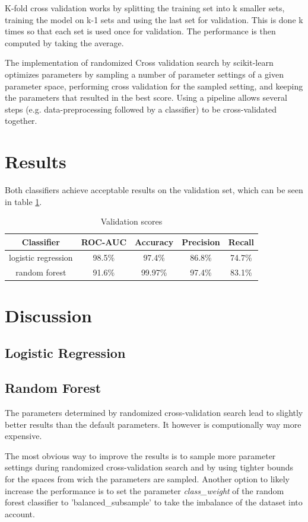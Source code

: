 \documentclass[a4, 10 pt, conference]{ieeeconf}  %
\begin{document}
K-fold cross validation works by splitting the training set into k smaller sets, training the model on k-1 sets and using the last set for validation. This is done k times so that each set is used once for validation. The performance is then computed by taking the average. \cite{sl.cv}

The implementation of randomized Cross validation search by scikit-learn optimizes parameters by sampling a number of parameter settings of a given parameter space, performing cross validation for the sampled setting, and keeping the parameters that resulted in the best score. Using a pipeline allows several steps (e.g. data-preprocessing followed by a classifier) to be cross-validated together. \cite{sl.rcv}

\section{Results}
\label{sec:results}
Both classifiers achieve acceptable results on the validation set, which can be seen in table \ref{tab:results}.

\begin{table}[h]
\centering
\begin{tabular}{c|c|c|c|c}
Classifier & ROC-AUC & Accuracy & Precision & Recall\\
\hline logistic regression & 98.5\% &  97.4\% & 86.8\% & 74.7\% \\
\hline random forest & 91.6\% & 99.97\% & 97.4\% & 83.1\%
\end{tabular}
\caption{Validation scores}
\label{tab:results}
\end{table}

\section{Discussion}
\label{sec:discuss}

\subsection{Logistic Regression}
\subsection{Random Forest}
The parameters determined by randomized cross-validation search lead to slightly better results than the default parameters. It however is computionally way more expensive.

The most obvious way to improve the results is to sample more parameter settings during randomized cross-validation search and by using tighter bounds for the spaces from wich the parameters are sampled. Another option to likely increase the performance is to set the parameter \emph{class\_weight} of the random forest classifier to 'balanced\_subsample' to take the imbalance of the dataset into account.
\end{document}
